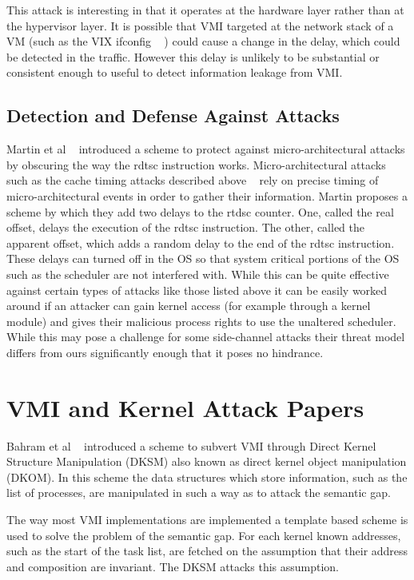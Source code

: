 This attack is interesting in that it operates at the hardware layer rather than at the hypervisor layer. It is possible that VMI targeted at the network stack of a VM (such as the VIX ifconfig ~\cite{hay_forensics_2008} ) could cause a change in the delay, which could be detected in the traffic. However this delay is unlikely to be substantial or consistent enough to useful to detect information leakage from VMI.

\subsection{Detection and Defense Against Attacks}

Martin et al ~\cite{martin2012timewarp} introduced a scheme to protect against micro-architectural attacks by obscuring the way the rdtsc instruction works. Micro-architectural attacks such as the cache timing attacks described above ~\cite{zhang_cross-vm_2012,ristenpart_hey_2009,zhang_homealone:_2011} rely on precise timing of micro-architectural events in order to gather their information. Martin proposes a scheme by which they add two delays to the rtdsc counter. One, called the real offset, delays the execution of the rdtsc instruction. The other, called the apparent offset, which adds a random delay to the end of the rdtsc instruction. These delays can turned off in the OS so that system critical portions of the OS such as the scheduler are not interfered with.  While this can be quite effective against certain types of attacks like those listed above it can be easily worked around if an attacker can gain kernel access (for example through a kernel module) and gives their malicious process rights to use the unaltered scheduler. While this may pose a challenge for some side-channel attacks their threat model differs from ours significantly enough that it poses no hindrance.

\section{VMI and Kernel Attack Papers}

Bahram et al ~\cite{bahram_dksm:_2010} introduced a scheme to subvert VMI through Direct Kernel Structure Manipulation (DKSM) also known as direct kernel object manipulation (DKOM). In this scheme the data structures which store information, such as the list of processes, are manipulated in such a way as to attack the semantic gap. 

The way most VMI implementations are implemented a template based scheme is used to solve the problem of the semantic gap. For each kernel known addresses, such as the start of the task list, are fetched on the assumption that their address and composition are invariant. The DKSM attacks this assumption. 

